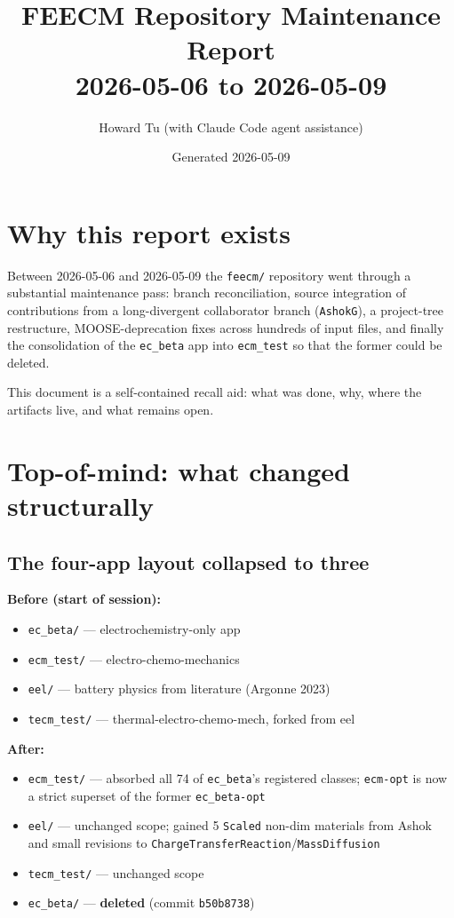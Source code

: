 \documentclass[11pt,letterpaper]{article}
\title{FEECM Repository Maintenance Report \\
\large 2026-05-06 to 2026-05-09}
\author{Howard Tu (with Claude Code agent assistance)}
\date{Generated 2026-05-09}
\newenvironment{tightitemize}{\begin{itemize}\setlength\itemsep{0pt}\setlength\parsep{0pt}}{\end{itemize}}
\newcommand{\code}[1]{\texttt{\small #1}}
\begin{document}
\maketitle

\section{Why this report exists}

Between 2026-05-06 and 2026-05-09 the \code{feecm/} repository went
through a substantial maintenance pass: branch reconciliation, source
integration of contributions from a long-divergent collaborator branch
(\code{AshokG}), a project-tree restructure, MOOSE-deprecation fixes
across hundreds of input files, and finally the consolidation of the
\code{ec\_beta} app into \code{ecm\_test} so that the former could be
deleted.

This document is a self-contained recall aid: what was done, why,
where the artifacts live, and what remains open.

\section{Top-of-mind: what changed structurally}

\subsection{The four-app layout collapsed to three}

\textbf{Before (start of session):}
\begin{tightitemize}
  \item \code{ec\_beta/} --- electrochemistry-only app
  \item \code{ecm\_test/} --- electro-chemo-mechanics
  \item \code{eel/} --- battery physics from literature (Argonne 2023)
  \item \code{tecm\_test/} --- thermal-electro-chemo-mech, forked from eel
\end{tightitemize}

\textbf{After:}
\begin{tightitemize}
  \item \code{ecm\_test/} --- absorbed all 74 of \code{ec\_beta}'s registered classes; \code{ecm-opt} is now a strict superset of the former \code{ec\_beta-opt}
  \item \code{eel/} --- unchanged scope; gained 5 \code{*Scaled} non-dim materials from Ashok and small revisions to \code{ChargeTransferReaction}/\code{MassDiffusion}
  \item \code{tecm\_test/} --- unchanged scope
  \item \code{ec\_beta/} --- \textbf{deleted} (commit \code{b50b8738})
\end{tightitemize}
\end{document}
